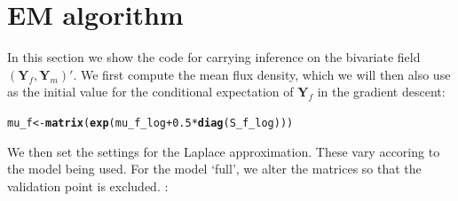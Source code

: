 \documentclass[a4paper,11pt]{article}\usepackage[]{graphicx}\usepackage[]{color}
\makeatletter
\newcommand{\hlnum}[1]{\textcolor[rgb]{0.686,0.059,0.569}{#1}}%
\newcommand{\hlopt}[1]{\textcolor[rgb]{0,0,0}{#1}}%
\newcommand{\hlstd}[1]{\textcolor[rgb]{0.345,0.345,0.345}{#1}}%
\newcommand{\hlkwb}[1]{\textcolor[rgb]{0.69,0.353,0.396}{#1}}%
\newcommand{\hlkwd}[1]{\textcolor[rgb]{0.737,0.353,0.396}{\textbf{#1}}}%
\newenvironment{kframe}{%
 \def\at@end@of@kframe{}%
 \ifinner\ifhmode%
  \def\at@end@of@kframe{\end{minipage}}%
  \begin{minipage}{\columnwidth}%
 \fi\fi%
 \def\FrameCommand##1{\hskip\@totalleftmargin \hskip-\fboxsep
 \colorbox{shadecolor}{##1}\hskip-\fboxsep
     \hskip-\linewidth \hskip-\@totalleftmargin \hskip\columnwidth}%
 \MakeFramed {\advance\hsize-\width
   \@totalleftmargin\z@ \linewidth\hsize
   \@setminipage}}%
 {\par\unskip\endMakeFramed%
 \at@end@of@kframe}
\newenvironment{knitrout}{}{} %
\newcommand{\Yvec}{\mathbf{Y}}
\makeatother
\begin{document}
\section{EM algorithm}

In this section we show the code for carrying inference on the bivariate field $(\Yvec_f,\Yvec_m)'$. We first compute the mean flux density, which we will then also use as the initial value for the conditional expectation of $\Yvec_f$ in the gradient descent:


\begin{knitrout}
\color{fgcolor}\begin{kframe}
\begin{alltt}
\hlstd{mu_f} \hlkwb{<-} \hlkwd{matrix}\hlstd{(}\hlkwd{exp}\hlstd{(mu_f_log} \hlopt{+} \hlnum{0.5}\hlopt{*}\hlkwd{diag}\hlstd{(S_f_log)))}
\end{alltt}
\end{kframe}
\end{knitrout}

We then set the settings for the Laplace approximation. These vary accoring to the model being used. For the model `full', we alter the matrices so that the validation point is excluded. :
\end{document}
